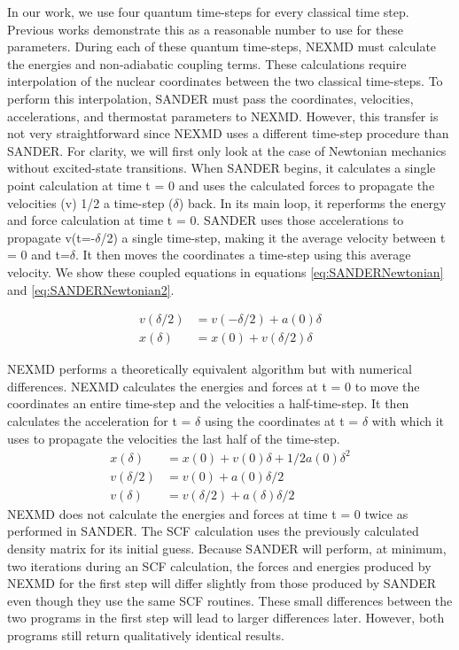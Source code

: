 In our work, we use four quantum time-steps for every classical time
step. Previous works demonstrate this as a reasonable number to use
for these parameters.\cite{nelson2012nonadiabatic} During each of
these quantum time-steps, NEXMD must calculate the energies and
non-adiabatic coupling terms. These calculations require interpolation
of the nuclear coordinates between the two classical time-steps. To
perform this interpolation, SANDER must pass the coordinates,
velocities, accelerations, and thermostat parameters to
NEXMD. However, this transfer is not very straightforward since NEXMD
uses a different time-step procedure than SANDER. For clarity, we will
first only look at the case of Newtonian mechanics without
excited-state transitions. When SANDER begins, it calculates a single
point calculation at time t = 0 and uses the calculated forces to
propagate the velocities (v) 1/2 a time-step (\(\delta\)) back. In its
main loop, it reperforms the energy and force calculation at time
t = 0. SANDER uses those accelerations to propagate v(t=-\(\delta\)/2) a
single time-step, making it the average velocity between t = 0 and
t=\(\delta\). It then moves the coordinates a time-step using this
average velocity. We show these coupled equations in equations
\ref{eq:SANDERNewtonian} and \ref{eq:SANDERNewtonian2}.

\begin{align}
  v(\delta/2) &= v(-\delta/2) + a(0)\delta \label{eq:SANDERNewtonian}\\
  x(\delta) &= x(0) + v(\delta/2) \delta \label{eq:SANDERNewtonian2}
\end{align}

NEXMD performs a theoretically equivalent algorithm but with numerical
differences. NEXMD calculates the energies and forces at t = 0 to move
the coordinates an entire time-step and the velocities a
half-time-step. It then calculates the acceleration for t = \(\delta\) using the
coordinates at t = \(\delta\) with which it uses to propagate the velocities the
last half of the time-step.
\begin{align}\label{eq:NEXMDNewtonian}
  x(\delta) &= x(0) + v(0)\delta + 1/2 a(0) \delta^2 \\
  v(\delta/2) &= v(0) + a(0)\delta/2\\
  v(\delta) &= v(\delta/2) + a(\delta)\delta/2
\end{align}
NEXMD does not calculate the energies and forces at time t = 0 twice as
performed in SANDER. The SCF calculation uses the previously
calculated density matrix for its initial guess. Because SANDER will
perform, at minimum, two iterations during an SCF calculation, the
forces and energies produced by NEXMD for the first step will differ
slightly from those produced by SANDER even though they use the same
SCF routines. These small differences between the two programs in the
first step will lead to larger differences later. However, both
programs still return qualitatively identical results.

